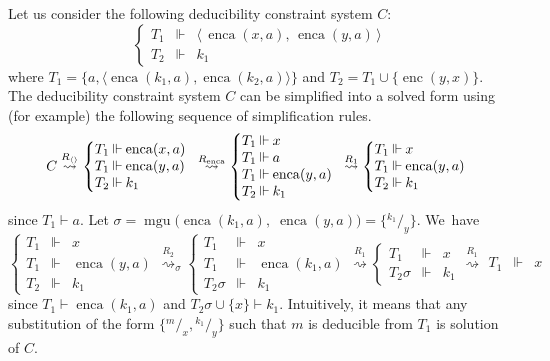 \documentclass[acmtocl,acmnow]{acmtrans2m}
\newcommand{\mgu}{\operatorname{mgu}}
\newcommand{\subst}[2]{{}^{#2}\!/_{\!#1}}
\newcommand{\enc}{\operatorname{enc}}
\newcommand{\enca}{\operatorname{enca}}
\newcommand{\pub}[1]{#1}
\newcommand{\simpl}{\rightsquigarrow}   \newcommand{\msimpl}{\rightsquigarrow}  \newcommand{\gsimpl}{\leadsto}
\newcommand{\dedsys}[1]{deducibility constraint system}
\begin{document}
\begin{example}
Let us consider the following \dedsys{} $C$:
\[\left\{\begin{array}{rcl}
T_1 & \Vdash&  \langle\,\enca(x,\pub{a}),\, \enca(y,\pub{a})\,\rangle \\
T_2 & \Vdash& k_1
  \end{array}\right.
\]
where $T_1 = \{a,\langle\enca(k_1,\pub{a}), \enca(k_2,\pub{a})\rangle\}$ and $T_2 =
T_1 \cup \{\enc(y,x)\}$.
The \dedsys{} $C$ can be simplified into
a solved form  using (for example) the following sequence
of simplification rules.\\
\[
C\stackrel{R_{\langle\rangle}}{\simpl}
\left\{\begin{array}{@{}r@{\:}c@{\:}l}
T_1& \Vdash& \enca(x,\pub{a})\\
T_1& \Vdash& \enca(y,\pub{a})\\
T_2 & \Vdash& k_1
\end{array}\right.
\stackrel{R_{\enca}}{\simpl}
\left\{\begin{array}{@{}r@{\:}c@{\:}l}
T_1& \Vdash& x\\
T_1& \Vdash& a\\
T_1& \Vdash& \enca(y,\pub{a})\\
T_2 & \Vdash& k_1
\end{array}\right.
\stackrel{R_1}{\simpl}
\left\{\begin{array}{@{}r@{\:}c@{\:}l}
T_1& \Vdash& x\\
T_1& \Vdash& \enca(y,\pub{a})\\
T_2 & \Vdash& k_1
\end{array}\right.
\]
since
$T_1 \vdash a$.
Let $\sigma = \mgu\big(\enca(k_1,\pub{a}),\; \enca(y,\pub{a})\big) = \{\subst{y}{k_1}\}$. We~have
\[\left\{\begin{array}{rcl}
T_1& \Vdash& x\\
T_1& \Vdash& \enca(y,\pub{a})\\
T_2 & \Vdash& k_1
\end{array}\right.
\stackrel{R_2}{\simpl}_{\sigma}
\left\{\begin{array}{rcl}
T_1& \Vdash& x\\
T_1& \Vdash& \enca(k_1,\pub{a})\\
T_2\sigma & \Vdash & k_1
\end{array}\right.
\stackrel{R_1}{\simpl}
\left\{\begin{array}{rcl}
T_1& \Vdash& x\\
T_2\sigma & \Vdash & k_1
\end{array}\right.
\stackrel{R_1}{\simpl}
\begin{array}{rcl}
T_1& \Vdash& x
\end{array}
\]
since $T_1\vdash \enca(k_1,\pub{a})$ and
$T_2\sigma \cup \{x\}\vdash k_1$.
Intuitively, it means that any substitution of the form $\{\subst{x}{m}, \subst{y}{k_1}\}$
such that $m$ is deducible from $T_1$ is solution of $C$.
\end{example}
\end{document}
